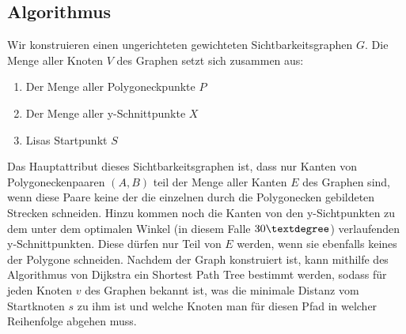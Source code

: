 \documentclass[a4paper,10pt,ngerman]{scrartcl}
\begin{document}
\subsection{Algorithmus}
Wir konstruieren einen ungerichteten gewichteten Sichtbarkeitsgraphen $G$. Die Menge aller Knoten $V$ des Graphen setzt sich zusammen aus:
\begin{enumerate}
\item Der Menge aller Polygoneckpunkte $P$
\item Der Menge aller y-Schnittpunkte $X$
\item Lisas Startpunkt $S$
\end{enumerate}
Das Hauptattribut dieses Sichtbarkeitsgraphen ist, dass nur Kanten von Polygoneckenpaaren $(A, B)$ teil der Menge aller Kanten $E$ des Graphen sind, wenn diese Paare keine der die einzelnen durch die Polygonecken gebildeten Strecken schneiden. Hinzu kommen noch die Kanten von den y-Sichtpunkten zu dem unter dem optimalen Winkel (in diesem Falle $30 \textdegree$) verlaufenden y-Schnittpunkten. Diese dürfen nur Teil von $E$ werden, wenn sie ebenfalls keines der Polygone schneiden. Nachdem der Graph konstruiert ist, kann mithilfe des Algorithmus von Dijkstra ein Shortest Path Tree bestimmt werden, sodass für jeden Knoten $v$ des Graphen bekannt ist, was die minimale Distanz vom Startknoten $s$ zu ihm ist und welche Knoten man für diesen Pfad in welcher Reihenfolge abgehen muss.
\end{document}
